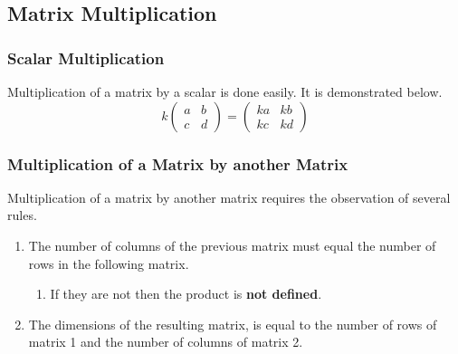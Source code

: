 \documentclass{report}
\begin{document}
\begin{flushleft}
\subsection{Matrix Multiplication}
\subsubsection{Scalar Multiplication}
Multiplication of a matrix by a scalar is done easily. It is demonstrated below.
\begin{equation}
k
\begin{pmatrix}
	a & b \\
	c & d
\end{pmatrix} = 
\begin{pmatrix}
	ka & kb \\
	kc & kd
\end{pmatrix}
\end{equation}

\subsubsection{Multiplication of a Matrix by another Matrix}
Multiplication of a matrix by another matrix requires the observation of several rules.

\begin{enumerate}
	\item The number of columns of the previous matrix must equal the number of rows in the following matrix.
	\begin{enumerate}
		\item If they are not then the product is \textbf{not defined}.
	\end{enumerate}
	\item The dimensions of the resulting matrix, is equal to the number of rows of matrix 1 and the number of columns of matrix 2.
\end{enumerate}


\end{flushleft}
\end{document}
